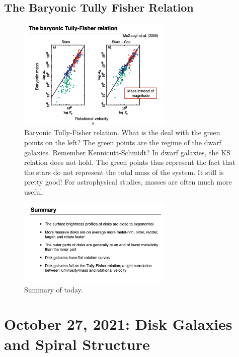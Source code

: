 \documentclass{article}
\begin{document}
\subsection{The Baryonic Tully Fisher Relation}

\begin{figure}
    \centering
    \includegraphics[width=0.66\textwidth]{figs/Screen Shot 2021-10-22 at 10.45.58 AM.png}
    \caption{Baryonic Tully-Fisher relation. What is the deal with the green points on the left? The green points are the regime of the dwarf galaxies. Remember Kennicutt-Schmidt? In dwarf galaxies, the KS relation does not hold. The green points thus represent the fact that the stars do not represent the total mass of the system. It still is pretty good! For astrophysical studies, masses are often much more useful. }
    \label{fig:BTF}
\end{figure}

\begin{figure}
    \centering
    \includegraphics[width=0.66\textwidth]{figs/Screen Shot 2021-10-22 at 10.48.54 AM.png}
    \caption{Summary of today. }
    \label{fig:summary_today_BTF}
\end{figure}


\section{October 27, 2021: Disk Galaxies and Spiral Structure}
\end{document}
